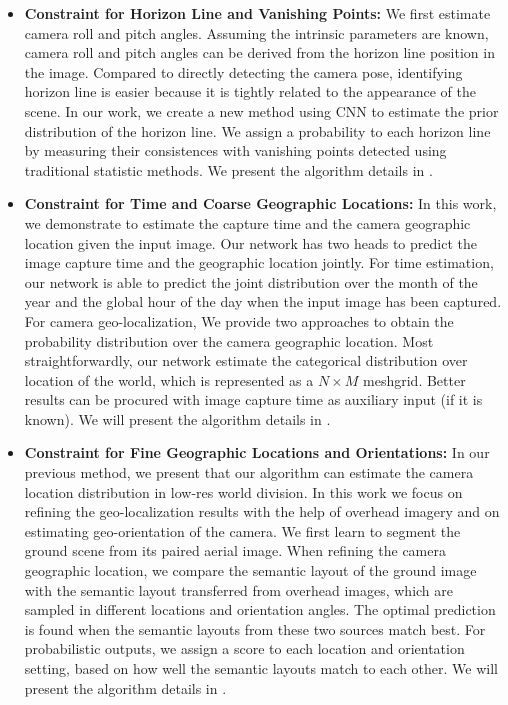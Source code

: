 \begin{itemize}[noitemsep]
  \item \textbf{Constraint for Horizon Line and Vanishing Points:}
  We first estimate camera roll and pitch angles. Assuming the intrinsic
  parameters are known, camera roll and pitch angles can be
  derived from the horizon line position in the image. Compared to
  directly detecting the camera pose, identifying horizon line is easier
  because it is tightly related to the appearance
  of the scene. In our work, we create a new method using CNN to
  estimate the prior distribution of the horizon line. We assign
  a probability to each horizon line by measuring their consistences
  with vanishing points detected using traditional statistic methods.
  We present the algorithm details in .
  \newline

  \item \textbf{Constraint for Time and Coarse Geographic Locations:}
  In this work, we demonstrate to estimate the capture time and the
  camera geographic location given the input image.
  Our network has two heads to predict the image
  capture time and the geographic location jointly.
  For time estimation, our network is able to predict the
  joint distribution over the month of the year and the global hour of the
  day when the input image has been captured.
  For camera geo-localization, We provide two approaches to obtain the
  probability distribution over the camera geographic location. Most
  straightforwardly, our network estimate the categorical distribution
  over location of the world, which is represented as a $N \times M$
  meshgrid. Better results can be procured with image capture time as
  auxiliary input (if it is known). 
  We will present the algorithm details in .
  \newline

  \item \textbf{Constraint for Fine Geographic Locations and Orientations:}
  In our previous method, we present that our algorithm can estimate
  the camera location distribution in low-res world division. In this
  work we focus on refining the geo-localization results with the help
  of overhead imagery and on estimating geo-orientation of the camera. 
  We first learn to segment the ground scene from its paired aerial image.
  When refining the camera geographic location, we compare the
  semantic layout of the ground image with the semantic layout
  transferred from overhead images, which are sampled in different
  locations and orientation angles. The optimal prediction is found when the
  semantic layouts from these two sources match best. For probabilistic
  outputs, we assign a score to each location and orientation setting,
  based on how well the semantic layouts match to each other. We will
  present the algorithm details in .
  \newline

\end{itemize}


